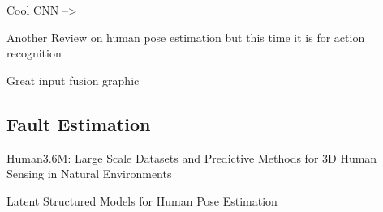 Cool CNN --> \cite{ElboushakiAbdessamad2020MAmf}

Another Review on human pose estimation but this time it is for action recognition \cite{ReviewHPEforActionRecognition}

Great input fusion graphic \cite{Seddik2017}

\subsection{Fault Estimation}

Human3.6M: Large Scale Datasets and Predictive Methods for 3D Human Sensing in Natural Environments \cite{h36m_pami}


Latent Structured Models for Human Pose Estimation \cite{IonescuSminchisescu11} 
